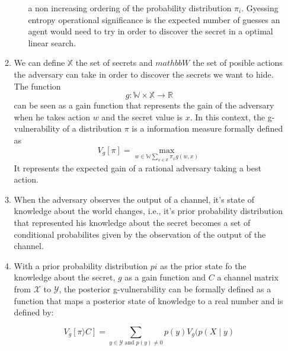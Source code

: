 \documentclass{article}
\begin{document}
\begin{enumerate}
\begin{enumerate}
\begin{enumerate}
			                  a non increasing ordering of the probability distribution \(\pi_i\). Gyessing entropy operational significance is the expected
			                  number of guesses an agent would need to try in order to discover the secret in a optimal linear search.
		            \end{enumerate}
		      \item We can define \(\mathbb{X}\) the set of secrets and \(mathbb{W}\) the set of posible actions the adversary
		            can take in order to discover the secrets we want to hide. The function \[g: \mathbb{W} \times \mathbb{X} \rightarrow \mathbb{R}\]
		            can be seen as a gain function that represents the gain of the adversary when he takes action \(w\) and the secret value is \(x\).
		            In this context, the g-vulnerability of a distribution \(\pi\) is a information measure formally defined as \[V_g[\pi] = \max_{w \in \mathbb{W} \sum_{x \in \mathbb{X}} \pi_x g(w, x)}\]
		            It represents the expected gain of a rational adversary taking a best action.
		      \item When the adversary observes the output of a channel, it's state of knowledge about the world changes, i.e.,
		            it's prior probability distribution that represented his knowledge about the secret becomes a set of conditional probabilites given by the observation
		            of the output of the channel.
		      \item With a prior probability distribution \(pi\) as the prior state fo the knowledge about the secret, \(g\) as a gain function
		            and \(C\) a channel matrix from \(\mathcal{X}\) to \(\mathcal{Y}\), the posterior g-vulnerability can be formally
		            defined as a function that maps a posterior state of knowledge to a real number and is defined by:

		            \[V_g[\pi \rangle C] = \sum_{y \in \mathcal{Y} \text{ and } p(y) \neq 0} p(y) V_g(p(X \mid y)\]


\end{enumerate}
\end{enumerate}
\end{document}
